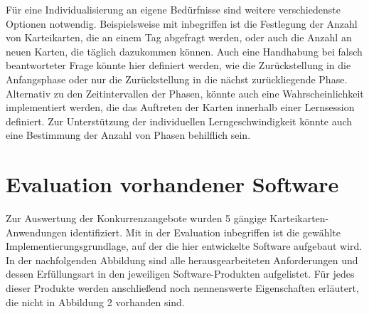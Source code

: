 \noindent Für eine Individualisierung an eigene Bedürfnisse sind weitere verschiedenste Optionen notwendig. Beispielsweise mit inbegriffen ist die Festlegung der Anzahl von Karteikarten, die an einem Tag abgefragt werden, oder auch die Anzahl an neuen Karten, die täglich dazukommen können. Auch eine Handhabung bei falsch beantworteter Frage könnte hier definiert werden, wie die Zurückstellung in die Anfangsphase oder nur die Zurückstellung in die nächst zurückliegende Phase. Alternativ zu den Zeitintervallen der Phasen, könnte auch eine Wahrscheinlichkeit implementiert werden, die das Auftreten der Karten innerhalb einer Lernsession definiert. Zur Unterstützung der individuellen Lerngeschwindigkeit könnte auch eine Bestimmung der Anzahl von Phasen behilflich sein. 



\section{Evaluation vorhandener Software}
Zur Auswertung der Konkurrenzangebote wurden 5 gängige Karteikarten-Anwendungen identifiziert. Mit in der Evaluation inbegriffen ist die gewählte Implementierungsgrundlage, auf der die hier entwickelte Software aufgebaut wird. In der nachfolgenden Abbildung sind alle herausgearbeiteten Anforderungen und dessen Erfüllungsart in den jeweiligen Software-Produkten aufgelistet. Für jedes dieser Produkte werden anschließend noch nennenswerte Eigenschaften erläutert, die nicht in Abbildung 2 vorhanden sind.

